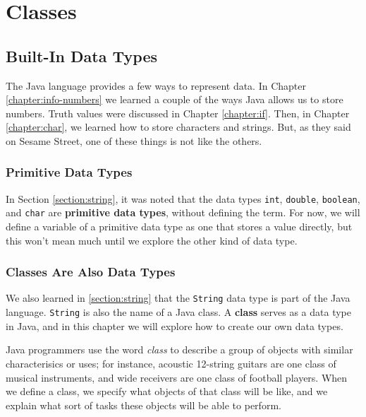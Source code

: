 
\chapter{Classes}
\label{chapter:classes}

\minitoc

\section{Built-In Data Types}

The Java language provides a few ways to represent data.  In Chapter \ref{chapter:info-numbers} we learned a couple of the ways Java allows us to store numbers.  Truth values were discussed in Chapter \ref{chapter:if}.  Then, in Chapter \ref{chapter:char}, we learned how to store characters and strings.  But, as they said on Sesame Street, one of these things is not like the others.

\subsection{Primitive Data Types}

In Section \ref{section:string}, it was noted that the data types \texttt{int}, \texttt{double}, \texttt{boolean}, and \texttt{char} are \textbf{primitive data types}, without defining the term.  For now, we will define a variable of a primitive data type as one that stores a value directly, but this won't mean much until we explore the other kind of data type.

\subsection{Classes Are Also Data Types}
We also learned in \ref{section:string} that the \texttt{String} data type is part of the Java language.  \texttt{String} is also the name of a Java class.  A \textbf{class} serves as a data type in Java, and in this chapter we will explore how to create our own data types.

Java programmers use the word \textit{class} to describe a group of objects with similar characterisics or uses; for instance, acoustic 12-string guitars are one class of musical instruments, and wide receivers are one class of football players.  When we define a class, we specify what objects of that class will be like, and we explain what sort of tasks these objects will be able to perform.

